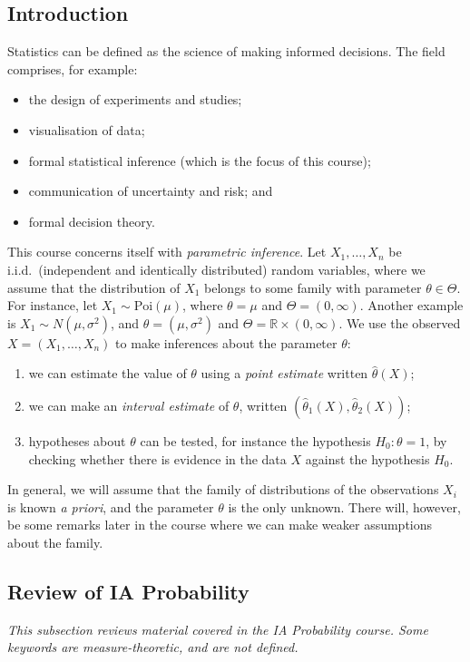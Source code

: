 \subsection{Introduction}
Statistics can be defined as the science of making informed decisions.
The field comprises, for example:
\begin{itemize}
	\item the design of experiments and studies;
	\item visualisation of data;
	\item formal statistical inference (which is the focus of this course);
	\item communication of uncertainty and risk; and
	\item formal decision theory.
\end{itemize}
This course concerns itself with \textit{parametric inference}.
Let \( X_1, \dots, X_n \) be i.i.d.\ (independent and identically distributed) random variables, where we assume that the distribution of \( X_1 \) belongs to some family with parameter \( \theta \in \Theta \).
For instance, let \( X_1 \sim \mathrm{Poi}(\mu) \), where \( \theta = \mu \) and \( \Theta = (0, \infty) \).
Another example is \( X_1 \sim N(\mu, \sigma^2) \), and \( \theta = (\mu, \sigma^2) \) and \( \Theta = \mathbb R \times (0, \infty) \).
We use the observed \( X = (X_1, \dots, X_n) \) to make inferences about the parameter \( \theta \):
\begin{enumerate}
	\item we can estimate the value of \( \theta \) using a \textit{point estimate} written \( \hat \theta(X) \);
	\item we can make an \textit{interval estimate} of \( \theta \), written \( (\hat \theta_1(X), \hat \theta_2(X)) \);
	\item hypotheses about \( \theta \) can be tested, for instance the hypothesis \( H_0 \colon \theta = 1 \), by checking whether there is evidence in the data \( X \) against the hypothesis \( H_0 \).
\end{enumerate}
\begin{remark}
	In general, we will assume that the family of distributions of the observations \( X_i \) is known \textit{a priori}, and the parameter \( \theta \) is the only unknown.
	There will, however, be some remarks later in the course where we can make weaker assumptions about the family.
\end{remark}

\subsection{Review of IA Probability}
\textit{This subsection reviews material covered in the IA Probability course.
	Some keywords are measure-theoretic, and are not defined.}

